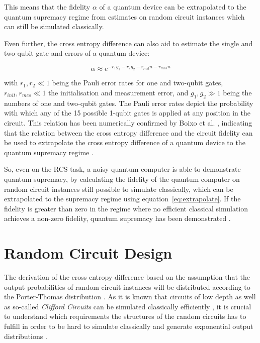 This means that the fidelity $\alpha$ of a quantum device can be extrapolated to
the quantum supremacy regime from estimates on random circuit instances
which can still be simulated classically.

Even further, the cross entropy difference can also aid to estimate
the single and two-qubit gate and errors of a quantum device:

\begin{equation}
  \alpha \approx e^{-r_1g_1 - r_2g_2 -r_{init}n -r_{mes}n}
\end{equation}

with $r_1, r_2 \ll 1$ being the Pauli error rates for one and two-qubit gates, $r_{init},
r_{mes} \ll 1$ the initialisation and measurement error, and $g_1,g_2 \gg 1$ being the
numbers of one and two-qubit gates. The Pauli error rates depict the 
probability with which any of the 15 possible 1-qubit gates is applied at any position in the circuit.
This relation has been numerically confirmed by
Boixo et al. \cite{Boixo2018supremacy}, indicating that the relation between the
cross entropy difference and the circuit fidelity can be used to extrapolate the
cross entropy difference of a quantum device to the quantum supremacy regime \cite{Boixo2018supremacy}.

So, even on the RCS task, a noisy quantum computer is able to demonstrate quantum
supremacy, by calculating the fidelity of the quantum computer on random circuit instances still possible to simulate
classically, which can be extrapolated to the supremacy regime using
equation~\ref{eq:extrapolate}.
If the fidelity is greater than zero in the regime where no efficient classical simulation achieves
a non-zero fidelity,
quantum supremacy has been demonstrated \cite{Boixo2018supremacy}.

\section{Random Circuit Design}
\label{sec:random_circuit_design}

The derivation of the cross entropy difference based on the assumption that the
output probabilities of random circuit instances will be distributed according to
the Porter-Thomas distribution \cite{Boixo2018supremacy}. As it is known that circuits of low depth as
well as so-called \textit{Clifford Circuits} can be simulated classically
efficiently \cite{gottesman1998heisenberg}, it is crucial to understand which requirements the structures of
the random circuits has to fulfill in order to be hard to simulate classically and generate
exponential output distributions \cite{Boixo2018supremacy}.

